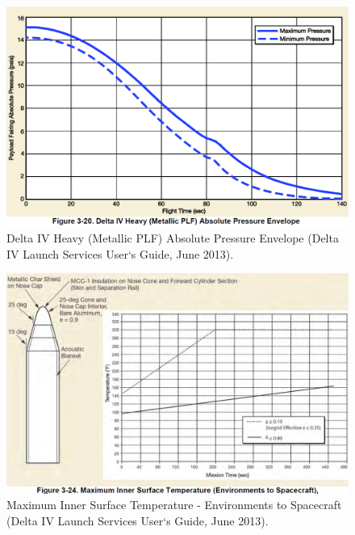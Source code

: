 \begin{figure}[h!]
\centering
\includegraphics[scale=0.3]{figures/Orbiter/pressure.png}
\caption{Delta IV Heavy (Metallic PLF) Absolute Pressure Envelope (Delta IV Launch Services User‘s Guide, June 2013).\cite{Atlasm}}
\end{figure}

\begin{figure}[h!]
\centering
\includegraphics[scale=0.3]{figures/Orbiter/shell_temp.png}
\caption{Maximum Inner Surface Temperature - Environments to Spacecraft (Delta IV Launch Services User‘s Guide, June 2013).\cite{Atlasm}}
\end{figure}

